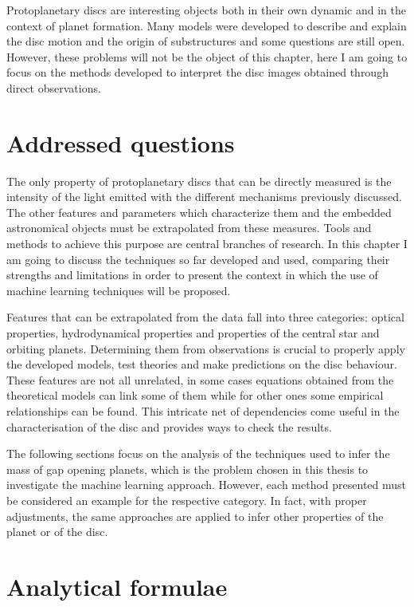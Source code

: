 \documentclass[a4paper,10pt]{report}
\begin{document}
Protoplanetary discs are interesting objects both in their own dynamic and
in the context of planet formation.
Many models were developed to describe and explain the disc motion and the origin of substructures and
some questions are still open. However, these problems will not be the object of this chapter, 
here I am going to focus on the methods developed to interpret the
disc images obtained through direct observations.

\section{Addressed questions}


The only property of protoplanetary discs that can be directly measured
is the intensity of the light emitted with the different mechanisms previously discussed.
The other features and parameters which characterize them and the embedded astronomical objects
must be extrapolated from these measures. 
Tools and methods to achieve this purpose are central branches of research. In this chapter I am going to discuss
the techniques so far developed and used, comparing their strengths and limitations in order to present the context
in which the use of machine learning techniques will be proposed.


Features that can be extrapolated from the data fall into three categories: optical properties, hydrodynamical properties
and properties of the central star and orbiting planets.
Determining them from observations is crucial
to properly apply the developed models, test theories and make predictions on the disc behaviour.
These features are not all unrelated, in some cases equations obtained from the theoretical
models can link some of them while for other ones some empirical relationships can be found.
This intricate net of dependencies come useful in the characterisation of the disc and provides 
ways to check the results.

The following sections focus on the analysis of the
techniques used to infer the mass of gap opening planets, which is
the problem chosen in this thesis to investigate the machine learning approach.
However, each method presented must be considered an example for the respective category. 
In fact, with proper adjustments, the same approaches are
applied to infer other properties of the planet or of the disc.

\section{Analytical formulae}
\end{document}
